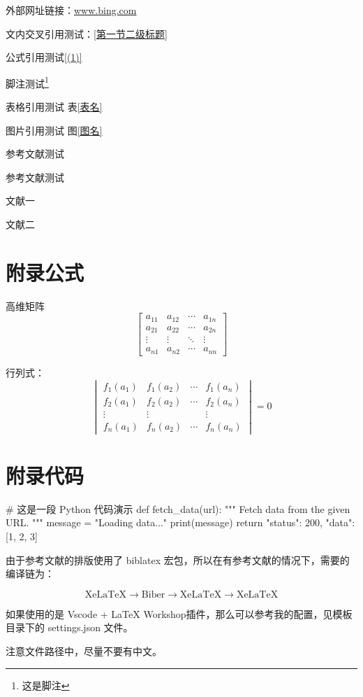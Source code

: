 \documentclass[a4paper,AutoFakeBold={2.7},UTF8,zihao=5,twoside]{ctexart} %
\numberwithin{equation}{section}%
\theoremstyle{definition}%
\begin{document}
外部网址链接：\url{www.bing.com}

文内交叉引用测试：\ref{第一节二级标题}

公式引用测试\eqref{(1)}

脚注测试\footnote{这是脚注}

表格引用测试 表\ref{表名}

图片引用测试 图\ref{图名}

参考文献测试

参考文献测试

文献一\parencite{ref1}

文献二\parencite{ref2}

\clearpage

\section{附录公式}

高维矩阵
\begin{equation}
    \begin{bmatrix}
        a_{11} & a_{12} & \cdots & a_{1n} \\
        a_{21} & a_{22} & \cdots & a_{2n} \\
        \vdots & \vdots & \ddots & \vdots \\
        a_{n1} & a_{n2} & \cdots & a_{nn}
    \end{bmatrix}
\end{equation}

行列式：
\begin{equation}
    \begin{vmatrix}
        f_1(a_1) & f_1(a_2) & \cdots & f_1(a_n) \\
        f_2(a_1) & f_2(a_2) & \cdots & f_2(a_n) \\
        \vdots   & \vdots   &        & \vdots   \\
        f_n(a_1) & f_n(a_2) & \cdots & f_n(a_n)
    \end{vmatrix}
    = 0
\end{equation}

\clearpage

\section{附录代码}

\begin{code}[Python]
    # 这是一段 Python 代码演示
    def fetch_data(url):
    """
    Fetch data from the given URL.
    """
    message = "Loading data..."
    print(message)
    return {"status": 200, "data": [1, 2, 3]}
\end{code}

由于参考文献的排版使用了 biblatex 宏包，所以在有参考文献的情况下，需要的编译链为：

\begin{equation*}
    \text{XeLaTeX} \to \text{Biber} \to \text{XeLaTeX} \to \text{XeLaTeX}
\end{equation*}

如果使用的是 Vscode + LaTeX Workshop插件，那么可以参考我的配置，见模板目录下的 settings.json 文件。

注意文件路径中，尽量不要有中文。
\end{document}
